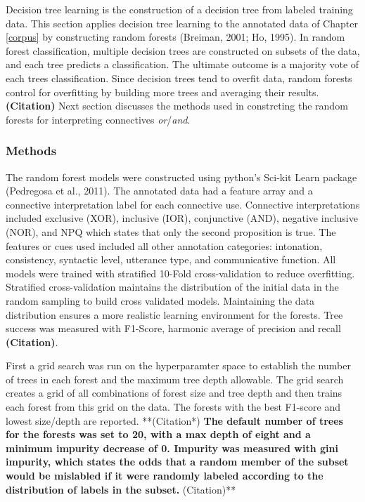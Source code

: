 \documentclass[floatsintext,man]{apa6}
\theoremstyle{definition}
\theoremstyle{definition}
\theoremstyle{definition}
\theoremstyle{remark}
\begin{document}
Decision tree learning is the construction of a decision tree from
labeled training data. This section applies decision tree learning to
the annotated data of Chapter \ref{corpus} by constructing random
forests (Breiman, 2001; Ho, 1995). In random forest classification,
multiple decision trees are constructed on subsets of the data, and each
tree predicts a classification. The ultimate outcome is a majority vote
of each trees classification. Since decision trees tend to overfit data,
random forests control for overfitting by building more trees and
averaging their results. \textbf{(Citation)} Next section discusses the
methods used in constrcting the random forests for interpreting
connectives \emph{or}/\emph{and}.

\subsubsection{Methods}\label{methods-1}

The random forest models were constructed using python's Sci-kit Learn
package (Pedregosa et al., 2011). The annotated data had a feature array
and a connective interpretation label for each connective use.
Connective interpretations included exclusive (XOR), inclusive (IOR),
conjunctive (AND), negative inclusive (NOR), and NPQ which states that
only the second proposition is true. The features or cues used included
all other annotation categories: intonation, consistency, syntactic
level, utterance type, and communicative function. All models were
trained with stratified 10-Fold cross-validation to reduce overfitting.
Stratified cross-validation maintains the distribution of the initial
data in the random sampling to build cross validated models. Maintaining
the data distribution ensures a more realistic learning environment for
the forests. Tree success was measured with F1-Score, harmonic average
of precision and recall \textbf{(Citation)}.

First a grid search was run on the hyperparamter space to establish the
number of trees in each forest and the maximum tree depth allowable. The
grid search creates a grid of all combinations of forest size and tree
depth and then trains each forest from this grid on the data. The
forests with the best F1-score and lowest size/depth are reported.
**(Citation*)\textbf{ The default number of trees for the forests was
set to 20, with a max depth of eight and a minimum impurity decrease of
0. Impurity was measured with gini impurity, which states the odds that
a random member of the subset would be mislabled if it were randomly
labeled according to the distribution of labels in the subset.
}(Citation)**
\end{document}
